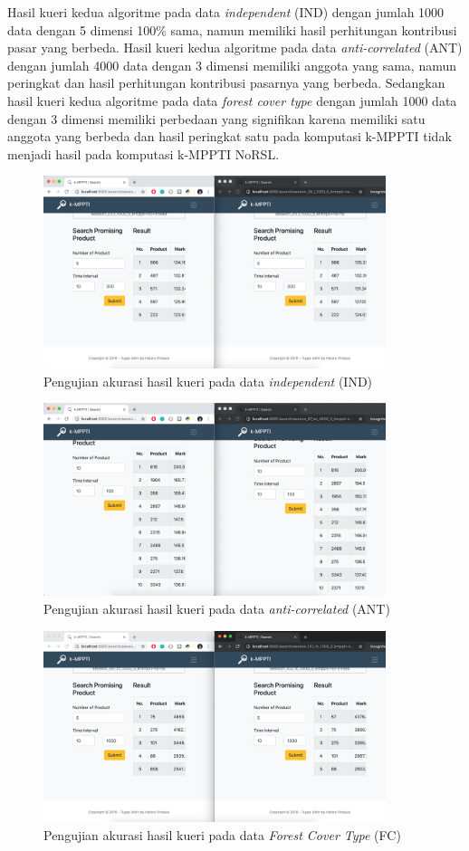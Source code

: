 Hasil kueri kedua algoritme pada data \textit{independent} (IND) dengan jumlah 1000 data dengan 5 dimensi 100\% sama, namun memiliki hasil perhitungan kontribusi pasar yang berbeda. Hasil kueri kedua algoritme pada data \textit{anti-correlated} (ANT) dengan jumlah 4000 data dengan 3 dimensi memiliki anggota yang sama, namun peringkat dan hasil perhitungan kontribusi pasarnya yang berbeda. Sedangkan hasil kueri kedua algoritme pada data \textit{forest cover type} dengan jumlah 1000 data dengan 3 dimensi memiliki perbedaan yang signifikan karena memiliki satu anggota yang berbeda dan hasil peringkat satu pada komputasi k-MPPTI tidak menjadi hasil pada komputasi k-MPPTI NoRSL.

\begin{figure}[H]
	\centering
	\includegraphics[width=10cm]{assets/img/bab5/pengujian-akurasi1.png}
	\caption{Pengujian akurasi hasil kueri pada data \textit{independent} (IND)}
	\label{fig:akurasi1}
\end{figure}

\begin{figure}[H]
	\centering
	\includegraphics[width=10cm]{assets/img/bab5/pengujian-akurasi3.png}
	\caption{Pengujian akurasi hasil kueri pada data \textit{anti-correlated} (ANT)}
	\label{fig:akurasi3}
\end{figure}

\begin{figure}[H]
	\centering
	\includegraphics[width=10cm]{assets/img/bab5/pengujian-akurasi2.png}
	\caption{Pengujian akurasi hasil kueri pada data \textit{Forest Cover Type} (FC)}
	\label{fig:akurasi2}
\end{figure}
